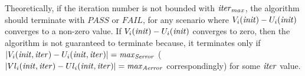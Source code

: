 



  


Theoretically, if the iteration number is not bounded with $\mathit{iter}_{max}$, the algorithm should terminate with $PASS$ or $FAIL$, for any scenario where $V_i(\mathit{init})-U_i(\mathit{init})$ converges to a non-zero value. If $V_i(\mathit{init})-U_i(\mathit{init})$ converges to zero, then the algorithm is not guaranteed to terminate because, it terminates only if $|V_i(\mathit{init},\mathit{iter})-U_i(\mathit{init},\mathit{iter})|=\mathit{max}_{\mathit{Serror}}$ ($|Vl_i(\mathit{init},\mathit{iter})-Ul_i(\mathit{init},\mathit{iter})|=\mathit{max}_{\mathit{Aerror}}$ correspondingly) for some $\mathit{iter}$ value. 
  




